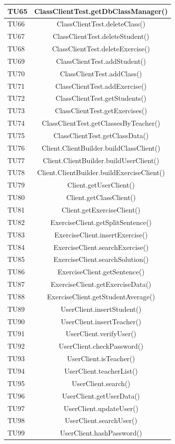 \begin{longtable}{|>{\centering\arraybackslash}m{1.6cm}|c|}
		TU65 & ClassClientTest.getDbClassManager()  \\ \hline
		TU66 & ClassClientTest.deleteClass()  \\ \hline
		TU67 & ClassClientTest.deleteStudent()  \\ \hline
		TU68 & ClassClientTest.deleteExercise()  \\ \hline
		TU69 & ClassClientTest.addStudent()  \\ \hline
		TU70 & ClassClientTest.addClass()  \\ \hline
		TU71 & ClassClientTest.addExercise()  \\ \hline
		TU72 & ClassClientTest.getStudents()  \\ \hline
		TU73 & ClassClientTest.getExercises()  \\ \hline
		TU74 & ClassClientTest.getClassesByTeacher()  \\ \hline
		TU75 & ClassClientTest.getClassData()  \\ \hline
		
		TU76 & Client.ClientBuilder.buildClassClient()  \\ \hline
		TU77 & Client.ClientBuilder.buildUserClient()  \\ \hline
		TU78 & Client.ClientBuilder.buildExerciseClient()  \\ \hline
		TU79 & Client.getUserClient()  \\ \hline
		TU80 & Client.getClassClient()  \\ \hline
		TU81 & Client.getExerciseClient()  \\ \hline
		
		TU82 & ExerciseClient.getSplitSentence()  \\ \hline
		TU83 & ExerciseClient.insertExercise()  \\ \hline
		TU84 & ExerciseClient.searchExercise()  \\ \hline
		TU85 & ExerciseClient.searchSolution()  \\ \hline
		TU86 & ExerciseClient.getSentence()  \\ \hline
		TU87 & ExerciseClient.getExerciseData()  \\ \hline
		TU88 & ExerciseClient.getStudentAverage()  \\ \hline
		
		TU89 & UserClient.insertStudent()  \\ \hline
		TU90 & UserClient.insertTeacher()  \\ \hline
		TU91 & UserClient.verifyUser()  \\ \hline
		TU92 & UserClient.checkPassword()  \\ \hline
		TU93 & UserClient.isTeacher()  \\ \hline
		TU94 & UserClient.teacherList()  \\ \hline
		TU95 & UserClient.search()  \\ \hline
		TU96 & UserClient.getUserData()  \\ \hline
		TU97 & UserClient.updateUser()  \\ \hline
		TU98 & UserClient.searchUser()  \\ \hline
		TU99 & UserClient.hashPassword()  \\ \hline


\end{longtable}
